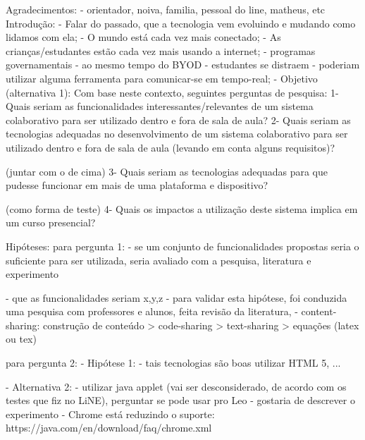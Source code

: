 \fi





\iffalse
        Agradecimentos: 
            - orientador, noiva, familia, pessoal do line, matheus, etc
        Introdução:
            - Falar do passado, que a tecnologia vem evoluindo e mudando como lidamos com ela;
            - O mundo está cada vez mais conectado;
            - As crianças/estudantes estão cada vez mais usando a internet;
            - programas governamentais 
            - ao mesmo tempo do BYOD
                - estudantes se distraem
                - poderiam utilizar alguma ferramenta para comunicar-se em tempo-real;
            - Objetivo (alternativa 1):
                Com base neste contexto, seguintes perguntas de pesquisa:
                    1- Quais seriam as funcionalidades interessantes/relevantes de um sistema colaborativo para ser utilizado dentro e fora de sala de aula?
                    2- Quais seriam as tecnologias adequadas no desenvolvimento de um sistema colaborativo para ser utilizado dentro e fora de sala de aula (levando em conta alguns requisitos)?

                    (juntar com o de cima) 3- Quais seriam as tecnologias adequadas para que pudesse funcionar em mais de uma plataforma e dispositivo?

                    (como forma de teste) 4- Quais os impactos a utilização deste sistema implica em um curso presencial?

                    Hipóteses:
                    para pergunta 1:
                        - se um conjunto de funcionalidades propostas seria o suficiente para ser utilizada, seria avaliado com a pesquisa, literatura e experimento

                        - que as funcionalidades seriam x,y,z
                            - para validar esta hipótese, foi conduzida uma pesquisa com professores e alunos, feita revisão da literatura, 
                        - content-sharing: construção de conteúdo > code-sharing > text-sharing > equações (latex ou tex)

                    para pergunta 2:
                        - Hipótese 1:
                            - tais tecnologias são boas utilizar HTML 5, ...

                            - Alternativa 2:
                                - utilizar java applet (vai ser desconsiderado, de acordo com os testes que fiz no LiNE), perguntar se pode usar pro Leo - gostaria de descrever o experimento
                                - Chrome está reduzindo o suporte:
                                    https://java.com/en/download/faq/chrome.xml

